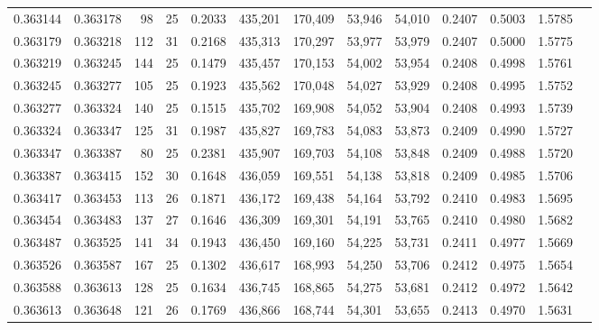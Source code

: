 \begin{tabular}{rrrrrrrrrrrrr}
0.363144 & 0.363178 &    98 &  25 &                                     0.2033 & 435,201 & 170,409 &  53,946 &  54,010 & 0.2407 & 0.5003 & 1.5785 \\
0.363179 & 0.363218 &   112 &  31 &                                     0.2168 & 435,313 & 170,297 &  53,977 &  53,979 & 0.2407 & 0.5000 & 1.5775 \\
0.363219 & 0.363245 &   144 &  25 &                                     0.1479 & 435,457 & 170,153 &  54,002 &  53,954 & 0.2408 & 0.4998 & 1.5761 \\
0.363245 & 0.363277 &   105 &  25 &                                     0.1923 & 435,562 & 170,048 &  54,027 &  53,929 & 0.2408 & 0.4995 & 1.5752 \\
0.363277 & 0.363324 &   140 &  25 &                                     0.1515 & 435,702 & 169,908 &  54,052 &  53,904 & 0.2408 & 0.4993 & 1.5739 \\
0.363324 & 0.363347 &   125 &  31 &                                     0.1987 & 435,827 & 169,783 &  54,083 &  53,873 & 0.2409 & 0.4990 & 1.5727 \\
0.363347 & 0.363387 &    80 &  25 &                                     0.2381 & 435,907 & 169,703 &  54,108 &  53,848 & 0.2409 & 0.4988 & 1.5720 \\
0.363387 & 0.363415 &   152 &  30 &                                     0.1648 & 436,059 & 169,551 &  54,138 &  53,818 & 0.2409 & 0.4985 & 1.5706 \\
0.363417 & 0.363453 &   113 &  26 &                                     0.1871 & 436,172 & 169,438 &  54,164 &  53,792 & 0.2410 & 0.4983 & 1.5695 \\
0.363454 & 0.363483 &   137 &  27 &                                     0.1646 & 436,309 & 169,301 &  54,191 &  53,765 & 0.2410 & 0.4980 & 1.5682 \\
0.363487 & 0.363525 &   141 &  34 &                                     0.1943 & 436,450 & 169,160 &  54,225 &  53,731 & 0.2411 & 0.4977 & 1.5669 \\
0.363526 & 0.363587 &   167 &  25 &                                     0.1302 & 436,617 & 168,993 &  54,250 &  53,706 & 0.2412 & 0.4975 & 1.5654 \\
0.363588 & 0.363613 &   128 &  25 &                                     0.1634 & 436,745 & 168,865 &  54,275 &  53,681 & 0.2412 & 0.4972 & 1.5642 \\
0.363613 & 0.363648 &   121 &  26 &                                     0.1769 & 436,866 & 168,744 &  54,301 &  53,655 & 0.2413 & 0.4970 & 1.5631 \\

\end{tabular}

